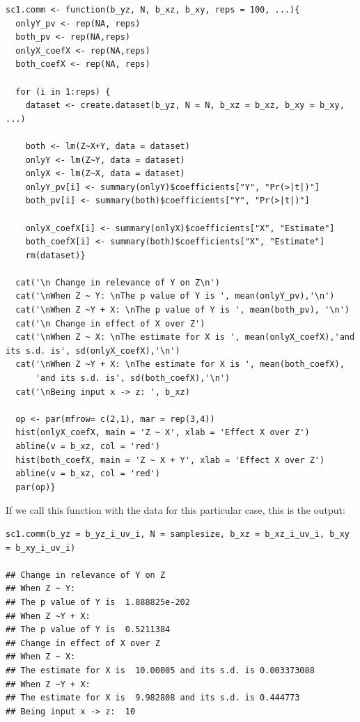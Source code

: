 \documentclass{article}
\begin{document}
\begin{lstlisting}
sc1.comm <- function(b_yz, N, b_xz, b_xy, reps = 100, ...){
  onlyY_pv <- rep(NA, reps)
  both_pv <- rep(NA,reps)
  onlyX_coefX <- rep(NA,reps)
  both_coefX <- rep(NA, reps)
  
  for (i in 1:reps) {
    dataset <- create.dataset(b_yz, N = N, b_xz = b_xz, b_xy = b_xy, ...)
    
    both <- lm(Z~X+Y, data = dataset)
    onlyY <- lm(Z~Y, data = dataset)
    onlyX <- lm(Z~X, data = dataset)
    onlyY_pv[i] <- summary(onlyY)$coefficients["Y", "Pr(>|t|)"]
    both_pv[i] <- summary(both)$coefficients["Y", "Pr(>|t|)"]
    
    onlyX_coefX[i] <- summary(onlyX)$coefficients["X", "Estimate"]
    both_coefX[i] <- summary(both)$coefficients["X", "Estimate"]
    rm(dataset)}
    
  cat('\n Change in relevance of Y on Z\n')
  cat('\nWhen Z ~ Y: \nThe p value of Y is ', mean(onlyY_pv),'\n')
  cat('\nWhen Z ~Y + X: \nThe p value of Y is ', mean(both_pv), '\n')
  cat('\n Change in effect of X over Z')
  cat('\nWhen Z ~ X: \nThe estimate for X is ', mean(onlyX_coefX),'and its s.d. is', sd(onlyX_coefX),'\n')
  cat('\nWhen Z ~Y + X: \nThe estimate for X is ', mean(both_coefX), 
      'and its s.d. is', sd(both_coefX),'\n')
  cat('\nBeing input x -> z: ', b_xz)
  
  op <- par(mfrow= c(2,1), mar = rep(3,4))
  hist(onlyX_coefX, main = 'Z ~ X', xlab = 'Effect X over Z')
  abline(v = b_xz, col = 'red')
  hist(both_coefX, main = 'Z ~ X + Y', xlab = 'Effect X over Z')
  abline(v = b_xz, col = 'red')
  par(op)}
\end{lstlisting}

If we call this function with the data for this particular case, this is the output: \par

\begin{lstlisting}
sc1.comm(b_yz = b_yz_i_uv_i, N = samplesize, b_xz = b_xz_i_uv_i, b_xy = b_xy_i_uv_i)

## Change in relevance of Y on Z
## When Z ~ Y: 
## The p value of Y is  1.888825e-202 
## When Z ~Y + X: 
## The p value of Y is  0.5211384 
## Change in effect of X over Z
## When Z ~ X: 
## The estimate for X is  10.00005 and its s.d. is 0.003373088 
## When Z ~Y + X: 
## The estimate for X is  9.982808 and its s.d. is 0.444773 
## Being input x -> z:  10
\end{lstlisting}
\end{document}
